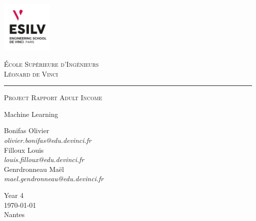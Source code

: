 
\begin{titlepage}
    \centering
    \includegraphics[height=2.5cm]{Images/Logo_esilv_png_blanc.png}\par
    \vspace{1\baselineskip}

      \Large {\scshape École Supérieure d'Ingénieurs}\\[0.5ex] 
      \Large {\scshape Léonard de Vinci}\
    \vspace{1\baselineskip}

    \rule{0.8\textwidth}{1.5pt}\par %
    \vspace{1\baselineskip}

    {\Huge\scshape Project Rapport Adult Income\par} %
    \vspace{0.5\baselineskip}
    {\Large Machine Learning\par} %
    \vspace{1.5\baselineskip}

    {\large Bonifas Olivier}\\[-1.5ex]
    {\small\textit{olivier.bonifas@edu.devinci.fr}}\\[1.5ex]
    {\large Filloux Louis}\\[-1.5ex]
    {\small\textit{louis.filloux@edu.devinci.fr}}\\[1.5ex]
    {\large Genrdronneau Maël}\\[-1.5ex]
    {\small\textit{mael.gendronneau@edu.devinci.fr}}\par

    \vfill %

    {\large Year 4}\\[0.5ex] %
    {\large \today}\\[1ex] %
    {Nantes}\par %
    \vspace{1\baselineskip} %

\end{titlepage}

\restoregeometry %